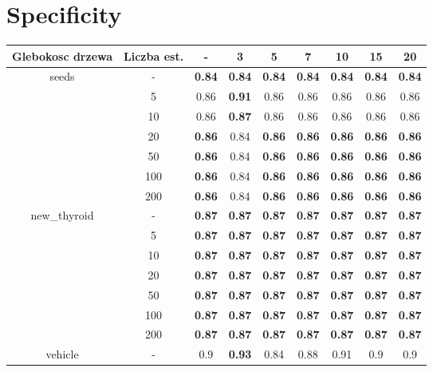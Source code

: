\documentclass{article}%
\begin{document}
%
\section*{Specificity}%
\begin{longtable}{c|c|ccccccc}%
\hline%
Glebokosc drzewa&Liczba est.&{-}&3&5&7&10&15&20\\%
\hline%
\multirow{7}{*}{seeds}&{-}&\textbf{0.84}&\textbf{0.84}&\textbf{0.84}&\textbf{0.84}&\textbf{0.84}&\textbf{0.84}&\textbf{0.84}\\%
\cline{2%
-%
9}%
&5&0.86&\textbf{0.91}&0.86&0.86&0.86&0.86&0.86\\%
\cline{2%
-%
9}%
&10&0.86&\textbf{0.87}&0.86&0.86&0.86&0.86&0.86\\%
\cline{2%
-%
9}%
&20&\textbf{0.86}&0.84&\textbf{0.86}&\textbf{0.86}&\textbf{0.86}&\textbf{0.86}&\textbf{0.86}\\%
\cline{2%
-%
9}%
&50&\textbf{0.86}&0.84&\textbf{0.86}&\textbf{0.86}&\textbf{0.86}&\textbf{0.86}&\textbf{0.86}\\%
\cline{2%
-%
9}%
&100&\textbf{0.86}&0.84&\textbf{0.86}&\textbf{0.86}&\textbf{0.86}&\textbf{0.86}&\textbf{0.86}\\%
\cline{2%
-%
9}%
&200&\textbf{0.86}&0.84&\textbf{0.86}&\textbf{0.86}&\textbf{0.86}&\textbf{0.86}&\textbf{0.86}\\%
\hline%
\multirow{7}{*}{new\_thyroid}&{-}&\textbf{0.87}&\textbf{0.87}&\textbf{0.87}&\textbf{0.87}&\textbf{0.87}&\textbf{0.87}&\textbf{0.87}\\%
\cline{2%
-%
9}%
&5&\textbf{0.87}&\textbf{0.87}&\textbf{0.87}&\textbf{0.87}&\textbf{0.87}&\textbf{0.87}&\textbf{0.87}\\%
\cline{2%
-%
9}%
&10&\textbf{0.87}&\textbf{0.87}&\textbf{0.87}&\textbf{0.87}&\textbf{0.87}&\textbf{0.87}&\textbf{0.87}\\%
\cline{2%
-%
9}%
&20&\textbf{0.87}&\textbf{0.87}&\textbf{0.87}&\textbf{0.87}&\textbf{0.87}&\textbf{0.87}&\textbf{0.87}\\%
\cline{2%
-%
9}%
&50&\textbf{0.87}&\textbf{0.87}&\textbf{0.87}&\textbf{0.87}&\textbf{0.87}&\textbf{0.87}&\textbf{0.87}\\%
\cline{2%
-%
9}%
&100&\textbf{0.87}&\textbf{0.87}&\textbf{0.87}&\textbf{0.87}&\textbf{0.87}&\textbf{0.87}&\textbf{0.87}\\%
\cline{2%
-%
9}%
&200&\textbf{0.87}&\textbf{0.87}&\textbf{0.87}&\textbf{0.87}&\textbf{0.87}&\textbf{0.87}&\textbf{0.87}\\%
\hline%
\multirow{7}{*}{vehicle}&{-}&0.9&\textbf{0.93}&0.84&0.88&0.91&0.9&0.9\\%

\end{longtable}
\end{document}
